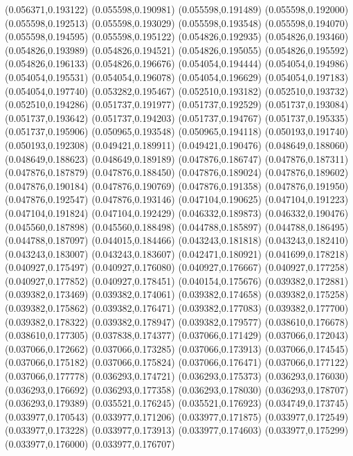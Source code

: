 (0.056371,0.193122)
(0.055598,0.190981)
(0.055598,0.191489)
(0.055598,0.192000)
(0.055598,0.192513)
(0.055598,0.193029)
(0.055598,0.193548)
(0.055598,0.194070)
(0.055598,0.194595)
(0.055598,0.195122)
(0.054826,0.192935)
(0.054826,0.193460)
(0.054826,0.193989)
(0.054826,0.194521)
(0.054826,0.195055)
(0.054826,0.195592)
(0.054826,0.196133)
(0.054826,0.196676)
(0.054054,0.194444)
(0.054054,0.194986)
(0.054054,0.195531)
(0.054054,0.196078)
(0.054054,0.196629)
(0.054054,0.197183)
(0.054054,0.197740)
(0.053282,0.195467)
(0.052510,0.193182)
(0.052510,0.193732)
(0.052510,0.194286)
(0.051737,0.191977)
(0.051737,0.192529)
(0.051737,0.193084)
(0.051737,0.193642)
(0.051737,0.194203)
(0.051737,0.194767)
(0.051737,0.195335)
(0.051737,0.195906)
(0.050965,0.193548)
(0.050965,0.194118)
(0.050193,0.191740)
(0.050193,0.192308)
(0.049421,0.189911)
(0.049421,0.190476)
(0.048649,0.188060)
(0.048649,0.188623)
(0.048649,0.189189)
(0.047876,0.186747)
(0.047876,0.187311)
(0.047876,0.187879)
(0.047876,0.188450)
(0.047876,0.189024)
(0.047876,0.189602)
(0.047876,0.190184)
(0.047876,0.190769)
(0.047876,0.191358)
(0.047876,0.191950)
(0.047876,0.192547)
(0.047876,0.193146)
(0.047104,0.190625)
(0.047104,0.191223)
(0.047104,0.191824)
(0.047104,0.192429)
(0.046332,0.189873)
(0.046332,0.190476)
(0.045560,0.187898)
(0.045560,0.188498)
(0.044788,0.185897)
(0.044788,0.186495)
(0.044788,0.187097)
(0.044015,0.184466)
(0.043243,0.181818)
(0.043243,0.182410)
(0.043243,0.183007)
(0.043243,0.183607)
(0.042471,0.180921)
(0.041699,0.178218)
(0.040927,0.175497)
(0.040927,0.176080)
(0.040927,0.176667)
(0.040927,0.177258)
(0.040927,0.177852)
(0.040927,0.178451)
(0.040154,0.175676)
(0.039382,0.172881)
(0.039382,0.173469)
(0.039382,0.174061)
(0.039382,0.174658)
(0.039382,0.175258)
(0.039382,0.175862)
(0.039382,0.176471)
(0.039382,0.177083)
(0.039382,0.177700)
(0.039382,0.178322)
(0.039382,0.178947)
(0.039382,0.179577)
(0.038610,0.176678)
(0.038610,0.177305)
(0.037838,0.174377)
(0.037066,0.171429)
(0.037066,0.172043)
(0.037066,0.172662)
(0.037066,0.173285)
(0.037066,0.173913)
(0.037066,0.174545)
(0.037066,0.175182)
(0.037066,0.175824)
(0.037066,0.176471)
(0.037066,0.177122)
(0.037066,0.177778)
(0.036293,0.174721)
(0.036293,0.175373)
(0.036293,0.176030)
(0.036293,0.176692)
(0.036293,0.177358)
(0.036293,0.178030)
(0.036293,0.178707)
(0.036293,0.179389)
(0.035521,0.176245)
(0.035521,0.176923)
(0.034749,0.173745)
(0.033977,0.170543)
(0.033977,0.171206)
(0.033977,0.171875)
(0.033977,0.172549)
(0.033977,0.173228)
(0.033977,0.173913)
(0.033977,0.174603)
(0.033977,0.175299)
(0.033977,0.176000)
(0.033977,0.176707)
